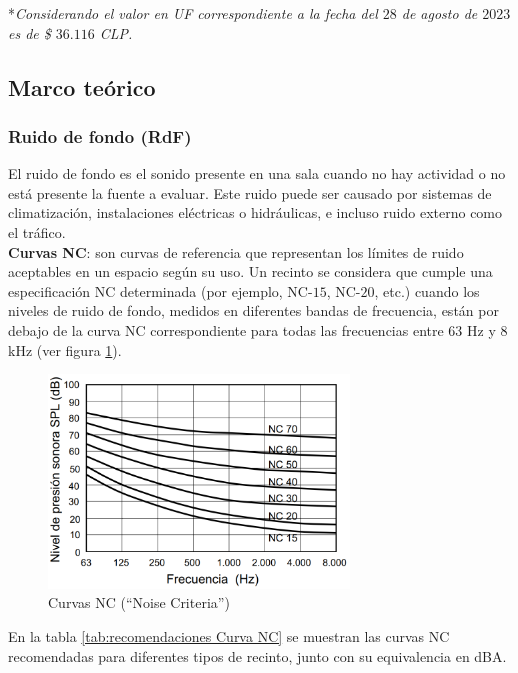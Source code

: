 *\textit{Considerando el valor en UF correspondiente a la fecha del $28$ de agosto de $2023$ es de \$ $36.116$ CLP.}


\subsection{Marco teórico}
\subsubsection{Ruido de fondo (RdF)}
El ruido de fondo es el sonido presente en una sala cuando no hay actividad o no está presente la fuente a evaluar. Este ruido puede ser causado por sistemas de climatización, instalaciones eléctricas o hidráulicas, e incluso ruido externo como el tráfico.\\
\textbf{Curvas NC}: son curvas de referencia que representan los límites de ruido aceptables en un espacio según su uso. Un recinto se considera que cumple una especificación NC determinada (por ejemplo, NC-$15$, NC-$20$, etc.) cuando los niveles de ruido de fondo, medidos en diferentes bandas de frecuencia, están por debajo de la curva NC correspondiente para todas las frecuencias entre $63$ Hz y $8$ kHz (ver figura \ref{fig:curvas NC}).\cite{carrion1990diseno}
    \begin{figure}[H]
        \centering
        \includegraphics[width=8cm]{Imagenes/MarcoTeorico/CurvaNC.png}
        \caption{Curvas NC (``Noise Criteria'')}
        \label{fig:curvas NC}
    \end{figure}
 En la tabla \ref{tab:recomendaciones Curva NC} se muestran las curvas NC recomendadas para diferentes tipos de recinto, junto con su equivalencia en dBA.
